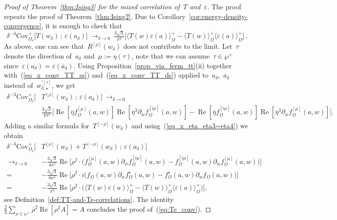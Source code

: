 \documentclass[reqno,11pt,a4paper]{amsart}
\theoremstyle{remark}
\newcommand{\Trho}{T^{[\rho]}}
\newcommand{\Rrho}{R^{[\rho]}}
\newcommand{\Tmrho}{T^{\left[-\rho \right]}}
\newcommand{\wptau}{w^{\prime[\tau]}}                   %
\newcommand{\f}{f_{\Omega}}
\newcommand{\fstar}{f_{\Omega}^\star}
\newcommand{\fmu}{f_{\Omega}^{[\mu]}}
\renewcommand\Re{\operatorname{Re}}
\newcommand\Corr[1]{\langle #1 \rangle}
\newcommand\CorrO[2][+]{\Corr{#2}_\Omega^{#1}}
\begin{document}
\begin{proof}[Proof of Theorem~\ref{thm:Ising3} for the mixed correlation of~$T$ and~$\varepsilon$] The proof repeats the proof of Theorem~\ref{thm:Ising2}. Due to Corollary~\ref{cor:energy-density-convergence}, it is enough to check that
\begin{equation}
\label{eq:Te_conv}
\delta^{-3}\mathrm{Cov}^+_{\Omega_\delta}\big[T(w_\delta)\,;\,\varepsilon(a_\delta)\big]\ \mathop{\to}_{\delta\to 0}\ \tfrac{3\sqrt{3}}{\pi^2}\big[\CorrO{T(w)\varepsilon(a)}-\CorrO{T(w)}\CorrO{\varepsilon(a)}\big]\,.
\end{equation}
As above, one can see that~$\Rrho(w_\delta)$ does not contribute to the limit. Let~$\tau$ denote the direction of~$a_\delta$ and~$\mu:=\eta(\tau)$, note that we can assume~$\tau\in\wp^+$ since~$\varepsilon(a_\delta)=\varepsilon(\overline{a}_\delta)$. Using Proposition~\ref{prop_via_ferm_tt}(ii) together with~(\ref{eq_x_conv_TT_ss}) and~(\ref{eq_x_conv_TT_ds}) applied to~$a_\delta$,~$\overline{a}_\delta$ instead of~$\wptau_{\delta,\star}$, we get
\begin{align*}
\delta^{-3}\mathrm{Cov}^+_{\Omega_\delta}\big[& \Trho(w_\delta)\,;\,\varepsilon(a_\delta)\big]~\mathop{\to}_{\delta\to 0}\\
  &{\tfrac{3\sqrt{3}}{4\pi^2}}\big[\Re[\overline{\eta}\fmu(a,w)]\Re[\overline{\eta}^3\partial_w\f^{[i\mu]}(a,w)] - \Re[\overline{\eta}\f^{[i\mu]}(a,w)]\Re[\overline{\eta}^3\partial_w\fmu(a,w)]\big].
\end{align*}
Adding a similar formula for~$\Tmrho(w_\delta)$ and using~(\ref{eq_x_eta_eta3=eta4}) we obtain
\begin{align*}
\delta^{-3}\mathrm{Cov}^+_{\Omega_\delta}\big[& \Trho(w_\delta)+\Tmrho(w_\delta)\,;\,\varepsilon(a_\delta)\big]\\
~\mathop{\to}_{\delta\to 0}~& -\tfrac{3\sqrt{3}}{4\pi^2}\Re\big[\rho^2\cdot\big(\fmu(a,w)\partial_w\f^{[i\mu]}(a,w)-\f^{[i\mu]}(a,w)\partial_w\fmu(a,w)\big)\big]\\
=~ &-\tfrac{3\sqrt{3}}{8\pi^2}\Re\big[\rho^2\cdot i\big(\f(a,w)\partial_w\fstar(a,w)-\fstar(a,w)\partial_w\f(a,w)\big)\big]\\
=~ &-\tfrac{3\sqrt{3}}{\pi^2}\Re\big[\rho^2\cdot \big(\CorrO{T(w)\varepsilon(a)}-\CorrO{T(w)}\CorrO{\varepsilon(a)}\big)\big],
\end{align*}
see Definition~\ref{def:TT-and-Te-correlations}. The identity~$\frac{2}{3}\sum_{\rho\in\wp^+}\overline{\rho}^2\Re[\rho^2 A]= A$ concludes the proof of~(\ref{eq:Te_conv}).
\end{proof}
\end{document}
